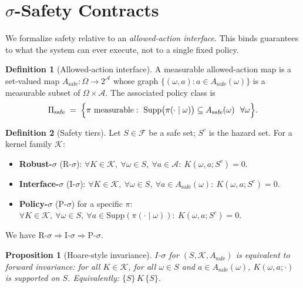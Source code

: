 \documentclass[11pt]{article}
\theoremstyle{plain}
\newtheorem{proposition}[theorem]{Proposition}
\theoremstyle{definition}
\newtheorem{definition}{Definition}
\theoremstyle{remark}
\newcommand{\supp}{\mathrm{Supp}}
\newcommand{\A}{\mathcal{A}}
\newcommand{\F}{\mathcal{F}}
\newcommand{\K}{\mathcal{K}}
\begin{document}
\section{\texorpdfstring{$\sigma$}{sigma}-Safety Contracts}

We formalize safety relative to an \emph{allowed-action interface}. This binds guarantees to what the system can ever execute, not to a single fixed policy.

\begin{definition}[Allowed-action interface]
A measurable allowed-action map is a set-valued map $A_{\mathrm{safe}}:\Omega\to 2^{\A}$ whose graph $\{(\omega,a): a\in A_{\mathrm{safe}}(\omega)\}$ is a measurable subset of $\Omega\times \A$.
The associated policy class is
\[
\Pi_{\mathrm{safe}} \;=\; \Bigl\{\pi\ \text{measurable}:\ \supp\bigl(\pi(\cdot\mid \omega)\bigr)\subseteq A_{\mathrm{safe}}(\omega)\ \ \forall \omega\Bigr\}.
\]
\end{definition}

\begin{definition}[Safety tiers]
Let $S\in\F$ be a safe set; $S^c$ is the hazard set. For a kernel family $\K$:
\begin{itemize}[leftmargin=1.3em]
\item \textbf{Robust-$\sigma$} (R-$\sigma$): $\forall K\in\K,\ \forall \omega\in S,\ \forall a\in \A:\ K(\omega,a;S^c)=0$.
\item \textbf{Interface-$\sigma$} (I-$\sigma$): $\forall K\in\K,\ \forall \omega\in S,\ \forall a\in A_{\mathrm{safe}}(\omega):\ K(\omega,a;S^c)=0$.
\item \textbf{Policy-$\sigma$} (P-$\sigma$) for a specific $\pi$: $\forall K\in\K,\ \forall \omega\in S,\ \forall a\in \supp(\pi(\cdot\mid\omega)):\ K(\omega,a;S^c)=0$.
\end{itemize}
We have $\text{R-}\sigma \Rightarrow \text{I-}\sigma \Rightarrow \text{P-}\sigma$.
\end{definition}

\begin{proposition}[Hoare-style invariance]
\label{prop:hoare}
$I$-$\sigma$ for $(S,\K,A_{\mathrm{safe}})$ is equivalent to forward invariance: for all $K\in\K$, for all $\omega\in S$ and $a\in A_{\mathrm{safe}}(\omega)$, $K(\omega,a;\cdot)$ is supported on $S$. Equivalently: $\{S\}\,K\,\{S\}$.
\end{proposition}
\end{document}
